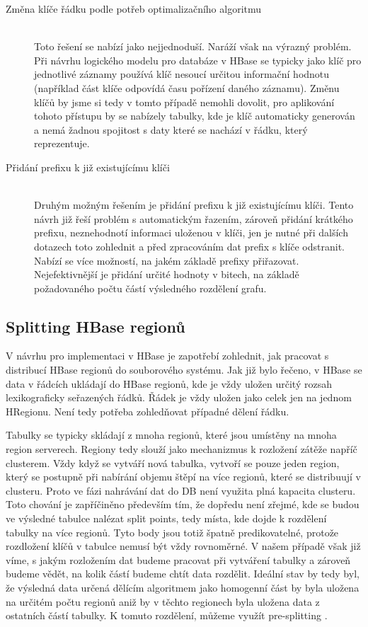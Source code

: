 \documentclass[thesis=M,czech]{FITthesis}[2012/06/26]
\begin{document}
\begin{description}
\item[Změna klíče řádku podle potřeb optimalizačního algoritmu] \hfill \\
 Toto řešení se nabízí jako nejjednoduší. Naráží však na výrazný problém. Při návrhu logického modelu pro databáze v HBase se typicky jako klíč pro jednotlivé záznamy používá klíč nesoucí určitou informační hodnotu (například část klíče odpovídá času pořízení daného záznamu). Změnu klíčů by jsme si tedy v tomto případě nemohli dovolit, pro aplikování tohoto přístupu by se nabízely tabulky, kde je klíč automaticky generován a nemá žadnou spojitost s daty které se nachází v řádku, který reprezentuje.
 
 \item[Přidání prefixu k již existujícímu klíči] \hfill \\
 Druhým možným řešením je přidání prefixu k již existujícímu klíči. Tento návrh již řeší problém s automatickým řazením, zároveň přidání krátkého prefixu, neznehodnotí informaci uloženou v klíči, jen je nutné při dalších dotazech toto zohlednit a před zpracováním dat prefix s klíče odstranit. Nabízí se více možností, na jakém základě prefixy přiřazovat. Nejefektivnější je přidání určité hodnoty v bitech, na základě požadovaného počtu částí výsledného rozdělení grafu.
 
\end{description} 

\subsection{Splitting HBase regionů}
V návrhu pro implementaci v HBase je zapotřebí zohlednit, jak pracovat s distribucí HBase regionů do souborového systému. Jak již bylo řečeno, v HBase se data v řádcích ukládají do HBase regionů, kde je vždy uložen určitý rozsah lexikograficky seřazených řádků. Řádek je vždy uložen jako celek jen na jednom HRegionu. Není tedy potřeba zohledňovat případné dělení řádku. 

Tabulky se typicky skládají z mnoha regionů, které jsou umístěny na mnoha region serverech. Regiony tedy slouží jako mechanizmus k rozložení zátěže napříč clusterem. Vždy když se vytváří nová tabulka, vytvoří se pouze jeden region, který se postupně při nabírání objemu štěpí na více regionů, které se distribuují v clusteru. Proto ve fázi nahrávání dat do DB není využita plná kapacita clusteru. Toto chování je zapříčiněno především tím, že dopředu není zřejmé, kde se budou ve výsledné tabulce nalézat split points, tedy místa, kde dojde k rozdělení tabulky na více regionů. Tyto body jsou totiž špatně predikovatelné, protože rozdložení klíčů v tabulce nemusí být vždy rovnoměrné. V našem případě však již víme, s jakým rozložením dat budeme pracovat při vytváření tabulky a zároveň budeme vědět, na kolik částí budeme chtít data rozdělit. Ideální stav by tedy byl, že výsledná data určená dělícím algoritmem jako homogenní část by byla uložena na určitém počtu regionů aniž by v těchto regionech byla uložena data z ostatních částí tabulky. K tomuto rozdělení, můžeme využít pre-splitting \cite{split}.
\end{document}
